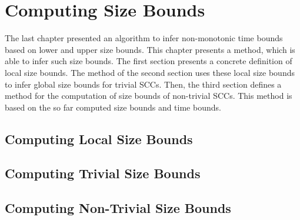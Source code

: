 \chapter{Computing Size Bounds}

The last chapter presented an algorithm to infer non-monotonic time bounds based on lower and upper size bounds.
This chapter presents a method, which is able to infer such size bounds.
The first section presents a concrete definition of local size bounds.
The method of the second section uses these local size bounds to infer global size bounds for trivial SCCs.
Then, the third section defines a method for the computation of size bounds of non-trivial SCCs.
This method is based on the so far computed size bounds and time bounds.

\section{Computing Local Size Bounds}



\section{Computing Trivial Size Bounds}



\section{Computing Non-Trivial Size Bounds}


